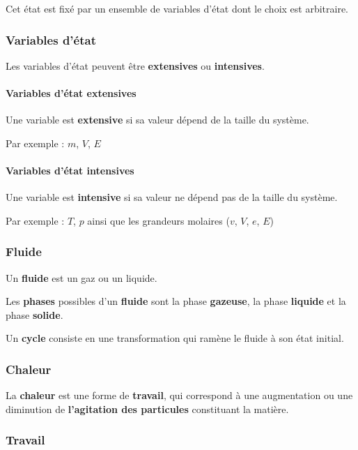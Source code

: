 \documentclass[]{article}
\let\oldparagraph\paragraph
\renewcommand{\paragraph}[1]{\oldparagraph{#1}\mbox{}}
\begin{document}
Cet état est fixé par un ensemble de variables d’état dont le choix est
arbitraire.

\subsubsection{Variables d’état}\label{variables-duxe9tat}

Les variables d’état peuvent être \textbf{extensives} ou
\textbf{intensives}.

\paragraph{Variables d’état
extensives}\label{variables-duxe9tat-extensives}

Une variable est \textbf{extensive} si sa valeur dépend de la taille du
système.

Par exemple : $m$, $V$, $E$

\paragraph{Variables d’état
intensives}\label{variables-duxe9tat-intensives}

Une variable est \textbf{intensive} si sa valeur ne dépend pas de la
taille du système.

Par exemple : $ T $, $ p $ ainsi que les grandeurs molaires
($ v $, $ V $, $ e $, $ E $)

\subsubsection{Fluide}\label{fluide}

Un \textbf{fluide} est un gaz ou un liquide.

Les \textbf{phases} possibles d’un \textbf{fluide} sont la phase
\textbf{gazeuse}, la phase \textbf{liquide} et la phase \textbf{solide}.

Un \textbf{cycle} consiste en une transformation qui ramène le fluide à
son état initial.

\subsubsection{Chaleur}\label{chaleur}

La \textbf{chaleur} est une forme de \textbf{travail}, qui correspond à
une augmentation ou une diminution de \textbf{l’agitation des
particules} constituant la matière.

\subsubsection{Travail}\label{travail}
\end{document}
